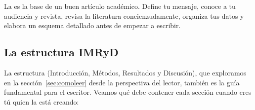 \begin{remember}
  \label{rem:planificacionarticulo}
  La  es la base de un buen artículo académico.
  Define tu mensaje, conoce a tu audiencia y revista, revisa la literatura
  concienzudamente, organiza tus datos y elabora un esquema detallado antes
  de empezar a escribir.
\end{remember}

\subsection*{La estructura IMRyD}
\label{sub:imrydescritor}

La estructura  (Introducción, Métodos, Resultados y
Discusión), que exploramos en la sección~\ref{sec:comoleer} desde la
perspectiva del lector, también es la guía fundamental para el escritor.
Veamos qué debe contener cada sección cuando eres tú quien la está creando:

